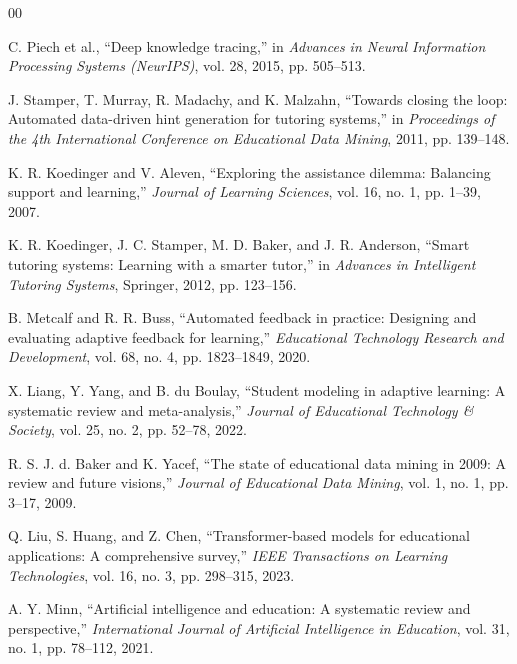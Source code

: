 \documentclass[conference]{IEEEtran}
\begin{document}
\begin{thebibliography}{00}

 C. Piech et al., ``Deep knowledge tracing,'' in \textit{Advances in Neural Information Processing Systems (NeurIPS)}, vol. 28, 2015, pp. 505--513.

 J. Stamper, T. Murray, R. Madachy, and K. Malzahn, ``Towards closing the loop: Automated data-driven hint generation for tutoring systems,'' in \textit{Proceedings of the 4th International Conference on Educational Data Mining}, 2011, pp. 139--148.

 K. R. Koedinger and V. Aleven, ``Exploring the assistance dilemma: Balancing support and learning,'' \textit{Journal of Learning Sciences}, vol. 16, no. 1, pp. 1--39, 2007.

 K. R. Koedinger, J. C. Stamper, M. D. Baker, and J. R. Anderson, ``Smart tutoring systems: Learning with a smarter tutor,'' in \textit{Advances in Intelligent Tutoring Systems}, Springer, 2012, pp. 123--156.

 B. Metcalf and R. R. Buss, ``Automated feedback in practice: Designing and evaluating adaptive feedback for learning,'' \textit{Educational Technology Research and Development}, vol. 68, no. 4, pp. 1823--1849, 2020.

 X. Liang, Y. Yang, and B. du Boulay, ``Student modeling in adaptive learning: A systematic review and meta-analysis,'' \textit{Journal of Educational Technology \& Society}, vol. 25, no. 2, pp. 52--78, 2022.

 R. S. J. d. Baker and K. Yacef, ``The state of educational data mining in 2009: A review and future visions,'' \textit{Journal of Educational Data Mining}, vol. 1, no. 1, pp. 3--17, 2009.

 Q. Liu, S. Huang, and Z. Chen, ``Transformer-based models for educational applications: A comprehensive survey,'' \textit{IEEE Transactions on Learning Technologies}, vol. 16, no. 3, pp. 298--315, 2023.

 A. Y. Minn, ``Artificial intelligence and education: A systematic review and perspective,'' \textit{International Journal of Artificial Intelligence in Education}, vol. 31, no. 1, pp. 78--112, 2021.

\end{thebibliography}
\end{document}
